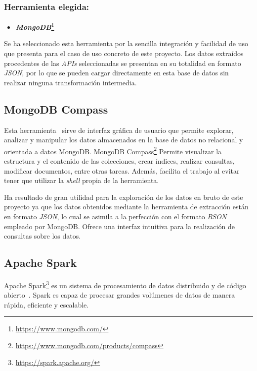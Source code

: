 \vspace{2cm}

\subsubsection{Herramienta elegida:}

\begin{itemize}
    \item \textbf{\textit{MongoDB}}\footnote{\url{https://www.mongodb.com/}}
\end{itemize}

Se ha seleccionado esta herramienta por la sencilla integración y facilidad de uso que presenta para el caso de uso concreto de este proyecto. Los datos extraídos procedentes de las \textit{APIs} seleccionadas se presentan en su totalidad en formato \textit{JSON}, por lo que se pueden cargar directamente en esta base de datos sin realizar ninguna transformación intermedia. 

\subsection{MongoDB Compass}

Esta herramienta~\cite{mongodbCompass} sirve de interfaz gráfica de usuario que permite explorar, analizar y manipular los datos almacenados en la base de datos no relacional y orientada a datos MongoDB. MongoDB Compass\footnote{\url{https://www.mongodb.com/products/compass}} Permite visualizar la estructura y el contenido de las colecciones, crear índices, realizar consultas, modificar documentos, entre otras tareas. Además, facilita el trabajo al evitar tener que utilizar la \textit{shell} propia de la herramienta.

Ha resultado de gran utilidad para la exploración de los datos en bruto de este proyecto ya que los datos obtenidos mediante la herramienta de extracción están en formato \textit{JSON}, lo cual se asimila a la perfección con el formato \textit{BSON} empleado por MongoDB. Ofrece una interfaz intuitiva para la realización de consultas sobre los datos.


\subsection{Apache Spark}

Apache Spark\footnote{\url{https://spark.apache.org/}} es un sistema de procesamiento de datos distribuido y de código abierto~\cite{apacheSpark}. Spark es capaz de procesar grandes volúmenes de datos de manera rápida, eficiente y escalable.

